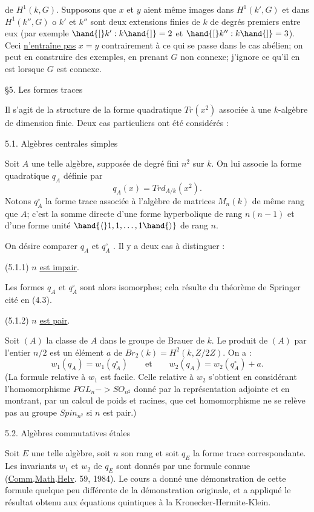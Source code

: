 
de $H^1(k, G)$. Supposons que $x$ et $y$ aient même images dans $H^1(k', G)$
et dans $H^1(k'', G)$ o $k'$ et $k''$ sont deux extensions finies de $k$ de
degrés premiers entre eux (par exemple $\hand{[}k':k\hand{]} = 2$ et $\hand{[}k'':k\hand{]} = 3$). Ceci
\uline{n'entraîne pas} $x = y$ contrairement à ce qui se passe dans le cas abélien;
on peut en construire des exemples, en prenant $G$ non connexe; j'ignore
ce qu'il en est lorsque $G$ est connexe.

§5. Les formes traces

Il s'agit de la structure de la forme quadratique $Tr(x^2)$ associée à
une $k$-algèbre de dimension finie. Deux cas particuliers ont été considérés :

5.1. Algèbres centrales simples

Soit $A$ une telle algèbre, supposée de degré fini $n^2$ sur $k$. On lui
associe la forme quadratique $q_A$ définie par
\[ q_A(x) = Trd_{A/k}(x^2). \]
Notons $q^\circ_A$ la forme trace associée à l'algèbre de matrices $M_n(k)$ de
même rang que $A$; c'est la somme directe d'une forme hyperbolique de rang
$n(n-1)$ et d'une forme unité $\hand{\langle}1,1,\ldots,1\hand{\rangle}$ de rang $n$.

On désire comparer $q_A$ et $q^\circ_A$ . Il y a deux cas à distinguer :

(5.1.1) $n$ \uline{est impair}.

Les formes $q_A$ et $q^\circ_A$ sont alors isomorphes; cela résulte du théorème de
Springer cité en (4.3).

(5.1.2) $n$ \uline{est pair}.

Soit $(A)$ la classe de $A$ dans le groupe de Brauer de $k$. Le produit
de $(A)$ par l'entier $n/2$ est un élément $a$ de $Br_2(k) = H^2(k, Z/2Z)$. On a :
\[ w_1(q_A) = w_1(q^\circ_A) \qquad \text{et} \qquad w_2(q_A) = w_2(q^\circ_A) + a . \]
(La formule relative à $w_1$ est facile. Celle relative à $w_2$ s'obtient en
considérant l'homomorphisme $PGL_n \mathrel{-\!\!>} SO_{n^2}$ donné par la représentation
adjointe et en montrant, par un calcul de poids et racines, que cet
homomorphisme ne se relève pas au groupe $Spin_{n^2}$ si $n$ est pair.)

5.2. Algèbres commutatives étales

Soit $E$ une telle algèbre, soit $n$ son rang et soit $q_E$ la forme
trace correspondante. Les invariants $w_1$ et $w_2$ de $q_E$ sont donnés par
une formule connue (\uline{Comm}.\uline{Math}.\uline{Helv}. 59, 1984). Le cours a donné une
démonstration de cette formule quelque peu différente de la démonstration
originale, et a appliqué le résultat obtenu aux équations quintiques à la
Kronecker-Hermite-Klein.

